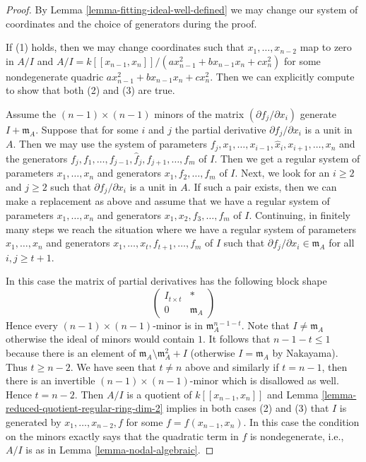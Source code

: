\begin{proof}
By Lemma \ref{lemma-fitting-ideal-well-defined}
we may change our system of coordinates and the
choice of generators during the proof.

\medskip\noindent
If (1) holds, then we may change coordinates such that
$x_1, \ldots, x_{n - 2}$ map to zero in $A/I$ and
$A/I = k[[x_{n - 1}, x_n]]/(a x_{n - 1}^2 + b x_{n - 1}x_n + c x_n^2)$
for some nondegenerate quadric $a x_{n - 1}^2 + b x_{n - 1}x_n + c x_n^2$.
Then we can explicitly compute to show that both (2) and (3) are true.

\medskip\noindent
Assume the $(n - 1) \times (n - 1)$ minors of the matrix
$(\partial f_j/\partial x_i)$ generate $I + \mathfrak m_A$.
Suppose that for some $i$ and $j$ the partial derivative
$\partial f_j/\partial x_i$ is a unit in $A$. Then
we may use the system of parameters
$f_j, x_1, \ldots, x_{i - 1}, \hat x_i, x_{i + 1}, \ldots, x_n$
and the generators
$f_j, f_1, \ldots, f_{j - 1}, \hat f_j, f_{j + 1}, \ldots, f_m$
of $I$. Then we get a regular system of parameters $x_1, \ldots, x_n$
and generators $x_1, f_2, \ldots, f_m$ of $I$.
Next, we look for an $i \geq 2$ and $j \geq 2$ such that
$\partial f_j/\partial x_i$ is a unit in $A$. If such a pair
exists, then we can make a replacement as above and assume
that we have a regular system of parameters
$x_1, \ldots, x_n$ and generators $x_1, x_2, f_3, \ldots, f_m$ of $I$.
Continuing, in finitely many steps we reach the situation where
we have a regular system of parameters
$x_1, \ldots, x_n$ and generators
$x_1, \ldots, x_t, f_{t + 1}, \ldots, f_m$ of $I$
such that $\partial f_j/\partial x_i \in \mathfrak m_A$
for all $i, j \geq t + 1$.

\medskip\noindent
In this case the matrix of partial derivatives has the following
block shape
$$
\left(
\begin{matrix}
I_{t \times t} & * \\
0 & \mathfrak m_A
\end{matrix}
\right)
$$
Hence every $(n - 1) \times (n - 1)$-minor is in $\mathfrak m_A^{n - 1 - t}$.
Note that $I \not = \mathfrak m_A$ otherwise the ideal of minors
would contain $1$. It follows that $n - 1 - t \leq 1$ because there
is an element of $\mathfrak m_A \setminus \mathfrak m_A^2 + I$ (otherwise
$I = \mathfrak m_A$ by Nakayama). Thus $t \geq n - 2$.
We have seen that $t \not = n$ above and similarly if
$t = n - 1$, then there is an invertible $(n - 1) \times (n - 1)$-minor
which is disallowed as well. Hence $t = n - 2$.
Then $A/I$ is a quotient of $k[[x_{n - 1}, x_n]]$ and
Lemma \ref{lemma-reduced-quotient-regular-ring-dim-2}
implies in both cases (2) and (3) that $I$ is generated by
$x_1, \ldots, x_{n - 2}, f$ for some $f = f(x_{n - 1}, x_n)$.
In this case the condition on the minors exactly says that the quadratic
term in $f$ is nondegenerate, i.e., $A/I$ is as in
Lemma \ref{lemma-nodal-algebraic}.
\end{proof}

